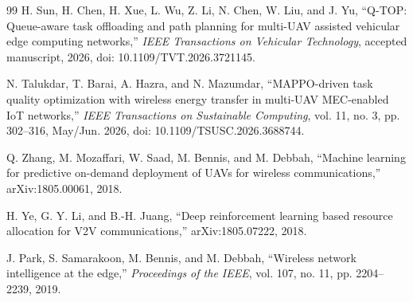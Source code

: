 \documentclass[journal]{IEEEtran}
\begin{document}
\begin{thebibliography}{99}
H. Sun, H. Chen, H. Xue, L. Wu, Z. Li, N. Chen, W. Liu, and J. Yu,
``Q-TOP: Queue-aware task offloading and path planning for multi-UAV assisted vehicular edge computing networks,''
\emph{IEEE Transactions on Vehicular Technology}, accepted manuscript,
2026, doi: 10.1109/TVT.2026.3721145.

N. Talukdar, T. Barai, A. Hazra, and N. Mazumdar,
``MAPPO-driven task quality optimization with wireless energy transfer in
multi-UAV MEC-enabled IoT networks,''
\emph{IEEE Transactions on Sustainable Computing}, vol. 11, no. 3,
pp. 302--316, May/Jun. 2026, doi: 10.1109/TSUSC.2026.3688744.

Q. Zhang, M. Mozaffari, W. Saad, M. Bennis, and M. Debbah,
``Machine learning for predictive on-demand deployment of UAVs for wireless communications,''
arXiv:1805.00061, 2018.

H. Ye, G. Y. Li, and B.-H. Juang,
``Deep reinforcement learning based resource allocation for V2V communications,''
arXiv:1805.07222, 2018.

J. Park, S. Samarakoon, M. Bennis, and M. Debbah,
``Wireless network intelligence at the edge,''
\emph{Proceedings of the IEEE}, vol. 107, no. 11, pp. 2204--2239, 2019.
\end{thebibliography}
\end{document}
